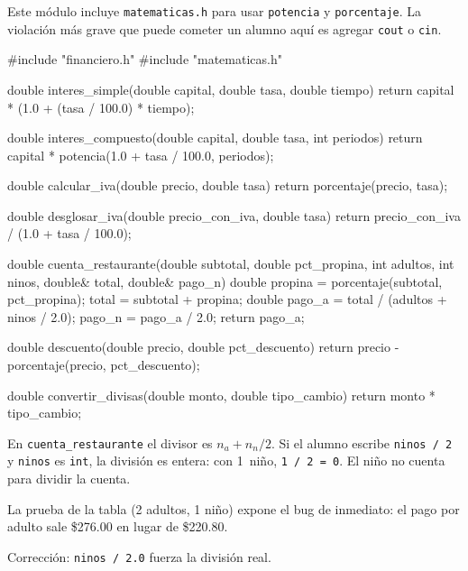 \documentclass[12pt, oneside]{article}
\begin{document}
\begin{notaprofesor}
  Este módulo incluye \texttt{matematicas.h} para usar \texttt{potencia}
  y \texttt{porcentaje}.  La violación más grave que puede cometer un
  alumno aquí es agregar \texttt{cout} o \texttt{cin}.

\begin{codigo}
#include "financiero.h"
#include "matematicas.h"

double interes_simple(double capital, double tasa, double tiempo) {
    return capital * (1.0 + (tasa / 100.0) * tiempo);
}

double interes_compuesto(double capital, double tasa, int periodos) {
    return capital * potencia(1.0 + tasa / 100.0, periodos);
}

double calcular_iva(double precio, double tasa) {
    return porcentaje(precio, tasa);
}

double desglosar_iva(double precio_con_iva, double tasa) {
    return precio_con_iva / (1.0 + tasa / 100.0);
}

double cuenta_restaurante(double subtotal, double pct_propina,
                          int adultos, int ninos,
                          double& total, double& pago_n) {
    double propina = porcentaje(subtotal, pct_propina);
    total          = subtotal + propina;
    double pago_a  = total / (adultos + ninos / 2.0);
    pago_n         = pago_a / 2.0;
    return pago_a;
}

double descuento(double precio, double pct_descuento) {
    return precio - porcentaje(precio, pct_descuento);
}

double convertir_divisas(double monto, double tipo_cambio) {
    return monto * tipo_cambio;
}
\end{codigo}
\end{notaprofesor}

\begin{notaprofesor}
  En \texttt{cuenta\_restaurante} el divisor es
  $n_a + n_n / 2$.  Si el alumno escribe \texttt{ninos / 2}
  y \texttt{ninos} es \texttt{int}, la división es entera: con
  1~niño, \texttt{1 / 2 = 0}.  El niño no cuenta para dividir la cuenta.

  La prueba de la tabla (2 adultos, 1 niño) expone el bug de inmediato:
  el pago por adulto sale \$276.00 en lugar de \$220.80.

  Corrección: \texttt{ninos / 2.0} fuerza la división real.
\end{notaprofesor}
\end{document}

